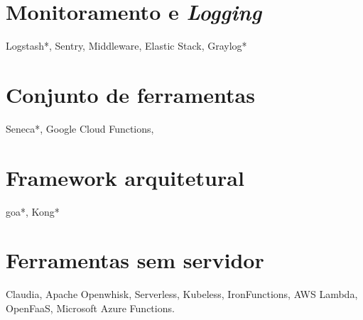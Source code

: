 


\section{Monitoramento e \emph{Logging}}
Logstash*, Sentry, Middleware, Elastic Stack, Graylog*

\section{Conjunto de ferramentas}
Seneca*, Google Cloud Functions,

\section{Framework arquitetural}
goa*, Kong*

\section{Ferramentas sem servidor}
Claudia, Apache Openwhisk, Serverless, Kubeless, IronFunctions, AWS Lambda, OpenFaaS, Microsoft Azure Functions.

